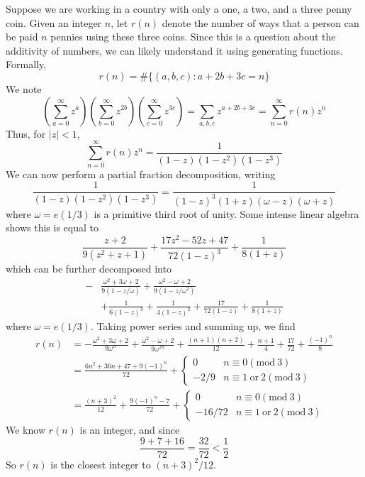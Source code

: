 \begin{example}
    Suppose we are working in a country with only a one, a two, and a three penny coin. Given an integer $n$, let $r(n)$ denote the number of ways that a person can be paid $n$ pennies using these three coins. Since this is a question about the additivity of numbers, we can likely understand it using generating functions. Formally,
    \[ r(n) = \# \{ (a,b,c): a + 2b + 3c = n \} \]
    We note
    \[ \left( \sum_{a = 0}^\infty z^a \right) \left( \sum_{b = 0}^\infty z^{2b} \right) \left( \sum_{c = 0}^\infty z^{3c} \right) = \sum_{a,b,c} z^{a + 2b + 3c} = \sum_{n = 0}^\infty r(n) z^n \]
    Thus, for $|z| < 1$,
    \[ \sum_{n = 0}^\infty r(n) z^n = \frac{1}{(1 - z)(1 - z^2)(1 - z^3)} \]
    We can now perform a partial fraction decomposition, writing
    \[ \frac{1}{(1-z)(1 - z^2)(1 - z^3)} = \frac{1}{(1-z)^3(1+z)(\omega - z)(\omega + z)} \]
    where $\omega = e(1/3)$ is a primitive third root of unity. Some intense linear algebra shows this is equal to
    \[ \frac{z + 2}{9(z^2 + z + 1)} + \frac{17 z^2 - 52 z + 47}{72 (1 - z)^3} + \frac{1}{8(1 + z)} \]
    which can be further decomposed into
    \begin{align*}
        - &\frac{\omega^2 + 3 \omega + 2}{9(1 - z/\omega)} + \frac{\omega^2 - \omega + 2}{9(1 - z/\omega^2)}\\
        &+ \frac{1}{6(1 - z)^3} + \frac{1}{4(1 - z)^2} + \frac{17}{72(1 - z)} + \frac{1}{8(1 + z)}
    \end{align*}
    where $\omega = e(1/3)$. Taking power series and summing up, we find
    \begin{align*}
        r(n) &= - \frac{\omega^2 + 3\omega + 2}{9 \omega^n} + \frac{\omega^2 - \omega + 2}{9 \omega^{2n}} + \frac{(n + 1)(n + 2)}{12} + \frac{n+1}{4} + \frac{17}{72} + \frac{(-1)^n}{8}\\
        &= \frac{6n^2 + 36n + 47 + 9(-1)^n}{72} + \begin{cases} 0 & n \equiv 0 (\text{mod}\ 3) \\ -2/9 & n \equiv 1\ \text{or}\ 2 (\text{mod}\ 3) \end{cases}\\
        &= \frac{(n + 3)^2}{12} + \frac{9 (-1)^n - 7}{72} + \begin{cases} 0 & n \equiv 0 (\text{mod}\ 3) \\ -16/72 & n \equiv 1\ \text{or}\ 2 (\text{mod}\ 3) \end{cases}    \end{align*}
        We know $r(n)$ is an integer, and since
        \[ \frac{9 + 7 + 16}{72} = \frac{32}{72} < \frac{1}{2} \]
        So $r(n)$ is the closest integer to $(n + 3)^2/12$.
\end{example}

